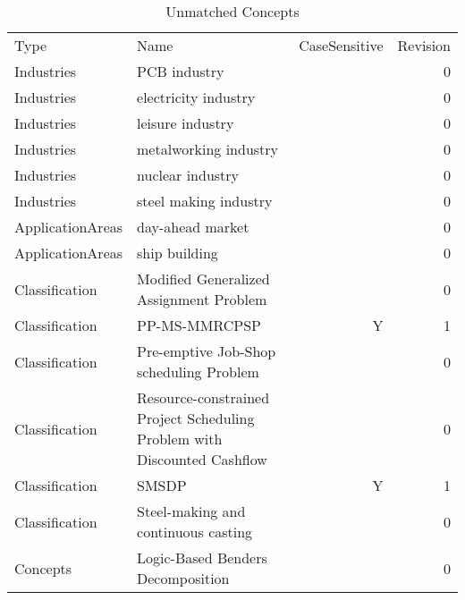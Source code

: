 {\scriptsize
\begin{longtable}{lp{10cm}rr}
\rowcolor{white}\caption{Unmatched Concepts}\\ \toprule
\rowcolor{white}Type & Name & CaseSensitive & Revision\\ \midrule
\endhead
\bottomrule
\endfoot
Industries & PCB industry &  & 0\\Industries & electricity industry &  & 0\\Industries & leisure industry &  & 0\\Industries & metalworking industry &  & 0\\Industries & nuclear industry &  & 0\\Industries & steel making industry &  & 0\\ApplicationAreas & day-ahead market &  & 0\\ApplicationAreas & ship building &  & 0\\Classification & Modified Generalized Assignment Problem &  & 0\\Classification & PP-MS-MMRCPSP & Y & 1\\Classification & Pre-emptive Job-Shop scheduling Problem &  & 0\\Classification & Resource-constrained Project Scheduling Problem with Discounted Cashflow &  & 0\\Classification & SMSDP & Y & 1\\Classification & Steel-making and continuous casting &  & 0\\Concepts & Logic-Based Benders Decomposition &  & 0\\\end{longtable}
}

